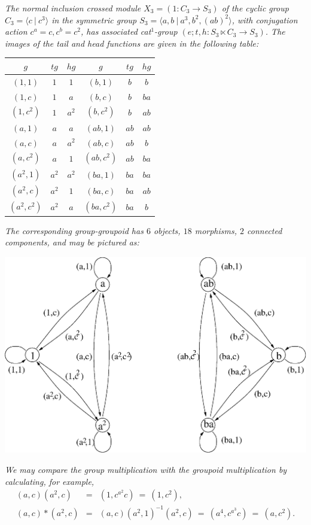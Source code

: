 \bigskip
\begin{example}
\emph{The normal inclusion crossed module $X_3 = (1 : C_3 \to S_3)$ 
of the cyclic group $C_3 = \langle c ~|~ c^3 \rangle$ 
in the symmetric group $S_3 = \langle a,b ~|~ a^3, b^2, (ab)^2 \rangle$,
with conjugation action $c^a=c, c^b=c^2$,
has associated cat$^1$-group $(e;t,h : S_3 \ltimes C_3 \to S_3)$.
The images of the tail and head functions are given in the following table:}
\begin{center}
\begin{tabular}{|ccc|ccc|}
\hline
$g$ & $tg$ & $hg$ & $g$ & $tg$ & $hg$ \\
\hline
$(1,1)$ & $1$ & $1$ &        $(b,1)$ & $b$ & $b$ \\
$(1,c)$ & $1$ & $a$ &        $(b,c)$ & $b$ & $ba$ \\
$(1,c^2)$ & $1$ & $a^2$ &    $(b,c^2)$ & $b$ & $ab$ \\
$(a,1)$ & $a$ & $a$ &        $(ab,1)$ & $ab$ & $ab$ \\
$(a,c)$ & $a$ & $a^2$ &      $(ab,c)$ & $ab$ & $b$ \\
$(a,c^2)$ & $a$ & $1$ &      $(ab,c^2)$ & $ab$ & $ba$ \\
$(a^2,1)$ & $a^2$ & $a^2$ &  $(ba,1)$ & $ba$ & $ba$ \\
$(a^2,c)$ & $a^2$ & $1$ &    $(ba,c)$ & $ba$ & $ab$ \\
$(a^2,c^2)$ & $a^2$ & $a$ &  $(ba,c^2)$ & $ba$ & $b$ \\
\hline
\end{tabular}
\end{center}
\emph{The corresponding group-groupoid has $6$ objects, $18$ morphisms, 
$2$ connected components, and may be pictured as:}
\begin{center}
\includegraphics[scale = 0.60]{xmodcat1/s3ggpd.eps}
\end{center}

\noindent
\emph{We may compare the group multiplication with the groupoid multiplication
by calculating, for example,}
\begin{eqnarray*}
(a,c)(a^2,c) &=& (1,c^{a^2}c) ~=~ (1,c^2), \\
(a,c)*(a^2,c)     &=& (a,c)(a^2,1)^{-1}(a^2,c) ~=~ (a^4,c^{a^3}c) ~=~ (a,c^2).
\end{eqnarray*}
\end{example}

